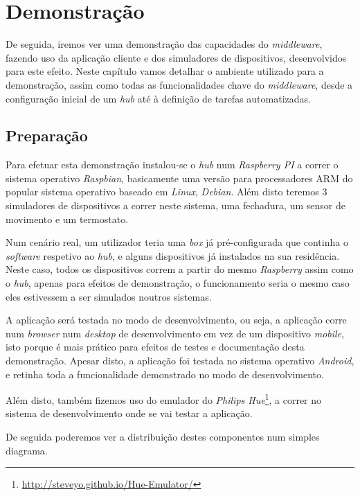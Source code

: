 \chapter{Demonstração}

De seguida, iremos ver uma demonstração das capacidades do \textit{middleware}, fazendo uso da aplicação cliente e dos simuladores de dispositivos, desenvolvidos para este efeito. Neste capítulo vamos detalhar o ambiente utilizado para a demonstração, assim como todas as funcionalidades chave do \textit{middleware}, desde a configuração inicial de um \textit{hub} até à definição de tarefas automatizadas.

\section{Preparação}

Para efetuar esta demonstração instalou-se o \textit{hub} num \textit{Raspberry PI} a correr o sistema operativo \textit{Raspbian}, basicamente uma versão para processadores ARM do popular sistema operativo baseado em \textit{Linux}, \textit{Debian}. Além disto teremos 3 simuladores de dispositivos a correr neste sistema, uma fechadura, um sensor de movimento e um termostato.

Num cenário real, um utilizador teria uma \textit{box} já pré-configurada que continha o \textit{software} respetivo ao \textit{hub}, e alguns dispositivos já instalados na sua residência. Neste caso, todos os dispositivos correm a partir do mesmo \textit{Raspberry} assim como o \textit{hub}, apenas para efeitos de demonstração, o funcionamento seria o mesmo caso eles estivessem a ser simulados noutros sistemas.

A aplicação será testada no modo de desenvolvimento, ou seja, a aplicação corre num \textit{browser} num \textit{desktop} de desenvolvimento em vez de um dispositivo \textit{mobile}, isto porque é mais prático para efeitos de testes e documentação desta demonstração. Apesar disto, a aplicação foi testada no sistema operativo \textit{Android}, e retinha toda a funcionalidade demonstrado no modo de desenvolvimento.

Além disto, também fizemos uso do emulador do \textit{Philips Hue}\footnote{\url{http://steveyo.github.io/Hue-Emulator/}}, a correr no sistema de desenvolvimento onde se vai testar a aplicação. 

De seguida poderemos ver a distribuição destes componentes num simples diagrama.

